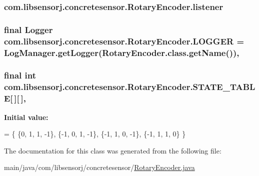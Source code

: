 \subsubsection[{listener}]{ com.\+libsensorj.\+concretesensor.\+Rotary\+Encoder.\+listener\hspace{0.3cm}{\ttfamily [private]}}\label{classcom_1_1libsensorj_1_1concretesensor_1_1RotaryEncoder_ae96674e284081057117e66d9bf2940ea}
\hypertarget{classcom_1_1libsensorj_1_1concretesensor_1_1RotaryEncoder_a0f4f58edd0f2ed3bf053b3578cfc3a8f}{}
\subsubsection[{L\+O\+G\+G\+E\+R}]{\setlength{\rightskip}{0pt plus 5cm}final Logger com.\+libsensorj.\+concretesensor.\+Rotary\+Encoder.\+L\+O\+G\+G\+E\+R = Log\+Manager.\+get\+Logger(Rotary\+Encoder.\+class.\+get\+Name())\hspace{0.3cm}{\ttfamily [static]}, {\ttfamily [private]}}\label{classcom_1_1libsensorj_1_1concretesensor_1_1RotaryEncoder_a0f4f58edd0f2ed3bf053b3578cfc3a8f}
\hypertarget{classcom_1_1libsensorj_1_1concretesensor_1_1RotaryEncoder_aca1c89ca07e97ca484ae85517660b9f0}{}
\subsubsection[{S\+T\+A\+T\+E\+\_\+\+T\+A\+B\+L\+E}]{\setlength{\rightskip}{0pt plus 5cm}final int com.\+libsensorj.\+concretesensor.\+Rotary\+Encoder.\+S\+T\+A\+T\+E\+\_\+\+T\+A\+B\+L\+E\mbox{[}$\,$\mbox{]}\mbox{[}$\,$\mbox{]}\hspace{0.3cm}{\ttfamily [static]}, {\ttfamily [private]}}\label{classcom_1_1libsensorj_1_1concretesensor_1_1RotaryEncoder_aca1c89ca07e97ca484ae85517660b9f0}
{\bfseries Initial value\+:}
\begin{DoxyCode}
= \{
        \{0, 1, 1, -1\},
        \{-1, 0, 1, -1\},
        \{-1, 1, 0, -1\},
        \{-1, 1, 1, 0\}
    \}
\end{DoxyCode}


The documentation for this class was generated from the following file\+:\begin{DoxyCompactItemize}
\item 
main/java/com/libsensorj/concretesensor/\hyperlink{RotaryEncoder_8java}{Rotary\+Encoder.\+java}\end{DoxyCompactItemize}
